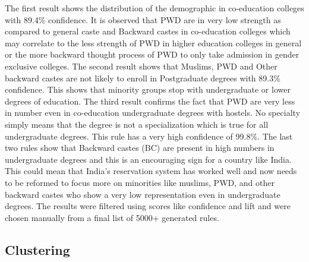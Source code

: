 The first result shows the distribution of the demographic in co-education colleges with 89.4\% confidence. It is observed that PWD are in very low strength as compared to general caste and Backward castes in co-education colleges which may correlate to the less strength of PWD in higher education colleges in general or the more backward thought process of PWD to only take admission in gender exclusive colleges. 
The second result shows that Muslims, PWD and Other backward castes are not likely to enroll in Postgraduate degrees with 89.3\% confidence. This shows that minority groups stop with undergraduate or lower degrees of education. 
The third result confirms the fact that PWD are very less in number even in co-education undergraduate degrees with hostels. No specialty simply means that the degree is not a specialization which is true for all undergraduate degrees. This rule has a very high confidence of 99.8\%.
The last two rules show that Backward castes (BC) are present in high numbers in undergraduate degrees and this is an encouraging sign for a country like India. This could mean that India's reservation system has worked well and now needs to be reformed to focus more on minorities like muslims, PWD, and other backward castes who show a very low representation even in undergraduate degrees.
The results were filtered using scores like confidence and lift and were chosen manually from a final list of 5000+ generated rules.


\subsection{Clustering}


